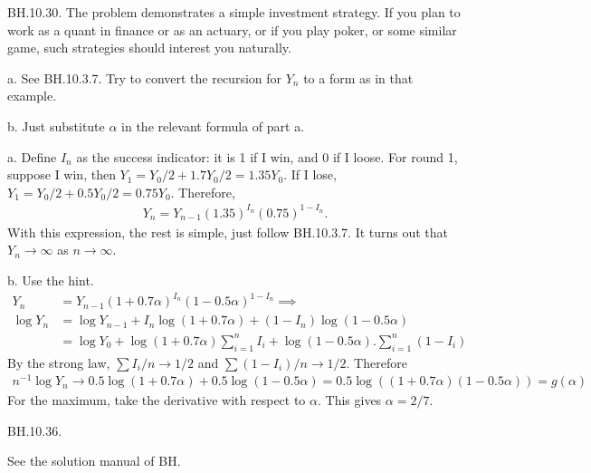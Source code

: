 \setcounter{theorem}{29}
\begin{exercise}
BH.10.30. The problem demonstrates a simple investment strategy.
If you plan to work as a quant in finance or as an actuary, or if you play poker, or some similar game, such strategies should interest you naturally.

\begin{hint}
a. See BH.10.3.7. Try to convert the recursion for $Y_n$ to a form as in that example.

b. Just substitute $\alpha$ in the relevant formula of part a.
\end{hint}
\begin{solution}
a. Define $I_n$ as the success indicator: it is 1 if I win, and 0 if I loose.  For round 1, suppose I win, then $Y_{1} = Y_0/2 + 1.7 Y_0/2= 1.35 Y_{0}$. If I lose,
$Y_{1} = Y_0/2 + 0.5 Y_0/2= 0.75 Y_{0}$. Therefore,
\begin{align*}
Y_n = Y_{n-1} (1.35)^{I_{n}}(0.75)^{1-I_{n}}.
\end{align*}
With this expression, the rest  is simple, just  follow  BH.10.3.7.
It turns out that $Y_n\to\infty$ as $n\to\infty$.

b. Use the hint.
\begin{align*}
Y_n &= Y_{n-1} (1+0.7\alpha)^{I_{n}}(1-0.5\alpha)^{1-I_{n}} \implies \\
\log Y_n &= \log Y_{n-1}  + I_{n} \log(1+0.7\alpha) + (1-I_{n})\log (1-0.5\alpha)  \\
& = \log Y_{0}  + \log(1+0.7\alpha) \sum_{i=1}^{n}I_{i}  + \log(1-0.5\alpha).\sum_{i=1}^{n} (1-I_{i})
\end{align*}
By the strong law, $\sum I_i/n \to 1/2$ and $\sum (1-I_{i})/n \to 1/2$. Therefore
\begin{align*}
n^{-1}\log Y_n \to 0.5 \log(1+0.7\alpha) + 0.5\log(1-0.5\alpha) = 0.5 \log( (1+0.7\alpha)(1-0.5\alpha)) = g(\alpha)
\end{align*}
For the maximum, take the derivative with respect to $\alpha$. This gives $\alpha=2/7$.
\end{solution}
\end{exercise}

\setcounter{theorem}{35}
\begin{exercise}
BH.10.36.
\begin{solution}
See the solution manual of BH.
\end{solution}
\end{exercise}


